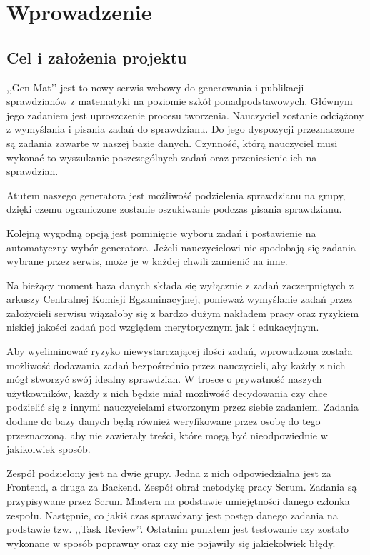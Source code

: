 \documentclass[oneside,polski,logo,indent]{amuthesis}
\begin{document}
\chapter{Wprowadzenie}

\section{Cel i założenia projektu}

,,Gen-Mat’’ jest to nowy serwis webowy do generowania i publikacji sprawdzianów z matematyki na poziomie szkół ponadpodstawowych. Głównym jego zadaniem jest uproszczenie procesu tworzenia. Nauczyciel zostanie odciążony z wymyślania i pisania zadań do sprawdzianu. Do jego dyspozycji przeznaczone są zadania zawarte w naszej bazie danych. Czynność, którą nauczyciel musi wykonać to wyszukanie poszczególnych zadań oraz przeniesienie ich na sprawdzian.

Atutem naszego generatora jest możliwość podzielenia sprawdzianu na grupy, dzięki czemu ograniczone zostanie oszukiwanie podczas pisania sprawdzianu.

Kolejną wygodną opcją jest pominięcie wyboru zadań i postawienie na automatyczny wybór generatora. Jeżeli nauczycielowi nie spodobają się zadania wybrane przez serwis, może je w każdej chwili zamienić na inne.

Na bieżący moment baza danych składa się wyłącznie z zadań zaczerpniętych z arkuszy Centralnej Komisji Egzaminacyjnej, ponieważ wymyślanie zadań przez założycieli serwisu wiązałoby się z bardzo dużym nakładem pracy oraz ryzykiem niskiej jakości zadań pod względem merytorycznym jak i edukacyjnym.

Aby wyeliminować ryzyko niewystarczającej ilości zadań, wprowadzona została możliwość dodawania zadań bezpośrednio przez nauczycieli, aby każdy z nich mógł stworzyć swój idealny sprawdzian. W trosce o prywatność naszych użytkowników, każdy z nich będzie miał możliwość decydowania czy chce podzielić się z innymi nauczycielami stworzonym przez siebie zadaniem. Zadania dodane do bazy danych będą również weryfikowane przez osobę do tego przeznaczoną, aby nie zawierały treści, które mogą być nieodpowiednie w jakikolwiek sposób.

Zespół podzielony jest na dwie grupy. Jedna z nich odpowiedzialna jest za Frontend, a druga za Backend. Zespół obrał metodykę pracy Scrum. Zadania są przypisywane przez Scrum Mastera na podstawie umiejętności danego członka zespołu. Następnie, co jakiś czas sprawdzany jest postęp danego zadania na podstawie tzw. ,,Task Review’’. Ostatnim punktem jest testowanie czy zostało wykonane w sposób poprawny oraz czy nie pojawiły się jakiekolwiek błędy.
\end{document}
